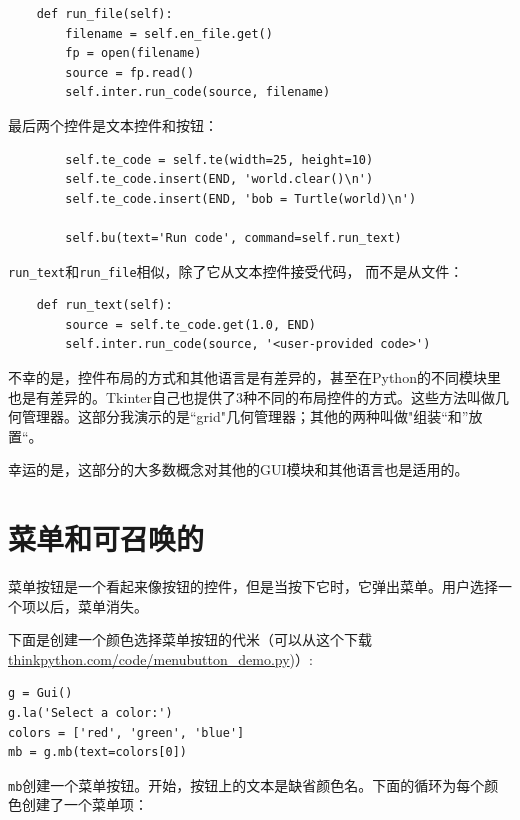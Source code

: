 \beforeverb
\begin{verbatim}
    def run_file(self):
        filename = self.en_file.get()
        fp = open(filename)
        source = fp.read()
        self.inter.run_code(source, filename)
\end{verbatim}
\afterverb
%

最后两个控件是文本控件和按钮：

\beforeverb
\begin{verbatim}
        self.te_code = self.te(width=25, height=10)
        self.te_code.insert(END, 'world.clear()\n')
        self.te_code.insert(END, 'bob = Turtle(world)\n')

        self.bu(text='Run code', command=self.run_text)
\end{verbatim}
\afterverb
%

\verb"run_text"和\verb"run_file"相似，除了它从文本控件接受代码，
而不是从文件：

\beforeverb
\begin{verbatim}
    def run_text(self):
        source = self.te_code.get(1.0, END)
        self.inter.run_code(source, '<user-provided code>')
\end{verbatim}
\afterverb

不幸的是，控件布局的方式和其他语言是有差异的，甚至在Python的不同模块里也是有差异的。Tkinter自己也提供了3种不同的布局控件的方式。这些方法叫做几何管理器。这部分我演示的是“grid"几何管理器；其他的两种叫做"组装“和”放置“。


幸运的是，这部分的大多数概念对其他的GUI模块和其他语言也是适用的。

\section{菜单和可召唤的}


菜单按钮是一个看起来像按钮的控件，但是当按下它时，它弹出菜单。用户选择一个项以后，菜单消失。

下面是创建一个颜色选择菜单按钮的代米（可以从这个下载\url{thinkpython.com/code/menubutton_demo.py})）:

\beforeverb
\begin{verbatim}
g = Gui()
g.la('Select a color:')
colors = ['red', 'green', 'blue']
mb = g.mb(text=colors[0])
\end{verbatim}
\afterverb
%

{\tt mb}创建一个菜单按钮。开始，按钮上的文本是缺省颜色名。下面的循环为每个颜色创建了一个菜单项：

